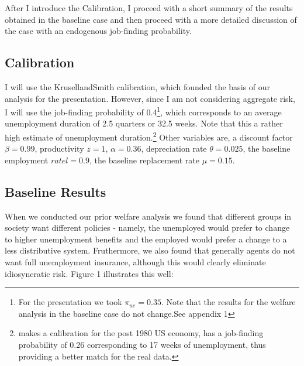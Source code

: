 \documentclass[a4paper,12pt]{article}
\begin{document}
After I introduce the Calibration, I proceed with a short summary of the results obtained in the baseline case and then proceed with a more detailed discussion of the case with an endogenous job-finding probability. 


\subsection{Calibration}

I will use the KrusellandSmith calibration, which founded the basis of our analysis for the presentation. However, since I am not considering aggregate risk, I will use the job-finding probability of 0.4\footnote{For the presentation we took $\pi_{ue}=0.35$. Note that the results for the welfare analysis in the baseline case do not change.See appendix 1}, which corresponds to an average unemployment duration of 2.5 quarters or 32.5 weeks. Note that this a rather high estimate of unemployment duration.\footnote{\cite{mukoyama} makes a calibration for the post 1980 US economy, has a job-finding probability of 0.26 corresponding to 17 weeks of unemployment, thus providing a better match for the real data.}
Other variables are, a discount factor $\beta = 0.99$, productivity $z = 1$, $\alpha = 0.36$, depreciation rate $\theta = 0.025$, the baseline employment $rate l=0.9$, the baseline replacement rate $\mu = 0.15$.

\subsection{Baseline Results}

When we conducted our prior welfare analysis we found that different groups in society want different policies - namely, the unemployed would prefer to change to higher unemployment benefits and the employed would prefer a change to a less distributive system. Fruthermore, we also found that generally agents do not want full unemployment insurance, although this would clearly eliminate idiosyncratic risk. 
Figure 1 illustrates this well: 
\end{document}
